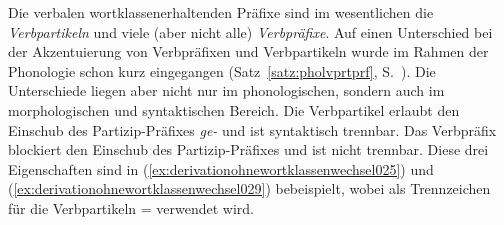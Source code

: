 
Die verbalen wortklassenerhaltenden Präfixe sind im wesentlichen die \textit{Verbpartikeln} und viele (aber nicht alle) \textit{Verbpräfixe}.
Auf einen Unterschied bei der Akzentuierung von Verbpräfixen und Verbpartikeln wurde im Rahmen der Phonologie schon kurz eingegangen (Satz~\ref{satz:pholvprtprf}, S.~\pageref{satz:pholvprtprf}).
Die Unterschiede liegen aber nicht nur im phonologischen, sondern auch im morphologischen und syntaktischen Bereich.
Die Verbpartikel erlaubt den Einschub des Partizip-Präfixes \textit{ge-} und ist syntaktisch trennbar.
Das Verbpräfix blockiert den Einschub des Partizip-Präfixes und ist nicht trennbar.
Diese drei Eigenschaften sind in (\ref{ex:derivationohnewortklassenwechsel025}) und (\ref{ex:derivationohnewortklassenwechsel029}) bebeispielt, wobei als Trennzeichen für die Verbpartikeln = verwendet wird.

\begin{exe}
\end{exe}

